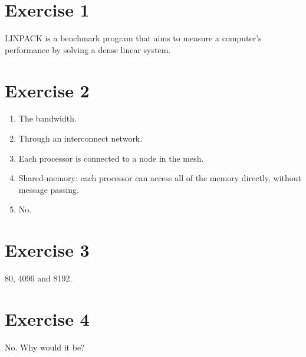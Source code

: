 \documentclass[a4paper, 12pt]{article}
\begin{document}
\section{Exercise 1} %
\label{sec:exercise_1}
LINPACK is a benchmark program that aims to measure a computer's performance by solving a dense linear system.

\section{Exercise 2} %
\label{sec:exercise_2}
\begin{enumerate}
	\item The bandwidth.
	\item Through an interconnect network.
	\item Each processor is connected to a node in the mesh.
	\item Shared-memory: each processor can access all of the memory directly, without message passing.
	\item No.
\end{enumerate}

\section{Exercise 3} %
\label{sec:exercise_3}
80, 4096 and 8192.

\section{Exercise 4} %
\label{sec:exercise_4}
No. Why would it be?
\end{document}
